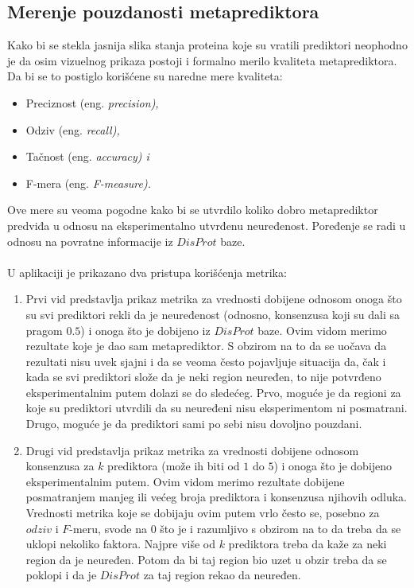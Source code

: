 \subsection{Merenje pouzdanosti metaprediktora}
Kako bi se stekla jasnija slika stanja proteina koje su vratili prediktori neophodno je da osim vizuelnog prikaza postoji i formalno merilo kvaliteta metaprediktora. Da bi se to postiglo korišćene su naredne mere kvaliteta:
\begin{itemize}
\item Preciznost (eng. \em{precision}), 
\item Odziv (eng.  \em{recall}), 
\item Tačnost (eng. \em{accuracy}) i 
\item F-mera (eng. \em{F-measure}). 
\end{itemize} 
Ove mere su veoma pogodne kako bi se utvrdilo koliko dobro metaprediktor predviđa u odnosu na eksperimentalno utvrđenu neuređenost. Poređenje se radi u odnosu na povratne informacije iz $DisProt$ baze.\\\\
U aplikaciji je prikazano dva pristupa korišćenja metrika:
\begin{enumerate}
\item Prvi vid predstavlja prikaz metrika za vrednosti dobijene odnosom onoga što su svi prediktori rekli da je neuređenost (odnosno, konsenzusa koji su dali sa pragom $0.5$) i onoga što je dobijeno iz $DisProt$ baze. Ovim vidom merimo rezultate koje je dao sam metaprediktor. S obzirom na to da se uočava da rezultati nisu uvek sjajni i da se veoma često pojavljuje situacija da, čak i kada se svi prediktori slože da je neki region neuređen, to nije potvrđeno eksperimentalnim putem dolazi se do sledećeg. Prvo, moguće je da regioni za koje su prediktori utvrdili da su neuređeni nisu eksperimentom ni posmatrani. Drugo, moguće je da prediktori sami po sebi nisu dovoljno pouzdani. 
\item Drugi vid predstavlja prikaz metrika za vrednosti dobijene odnosom konsenzusa za $k$ prediktora (može ih biti od $1$ do $5$) i onoga što je dobijeno eksperimentalnim putem. Ovim vidom merimo rezultate dobijene posmatranjem manjeg ili većeg broja prediktora i konsenzusa njihovih odluka. Vrednosti metrika koje se dobijaju ovim putem vrlo često se, posebno za $odziv$ i $F$-meru, svode na $0$ što je i razumljivo s obzirom na to da treba da se uklopi nekoliko faktora. Najpre više od $k$ prediktora treba da kaže za neki region da je neuređen. Potom da bi taj region bio uzet u obzir treba da se poklopi i da je $DisProt$ za taj region rekao da neuređen.  
\end{enumerate}

